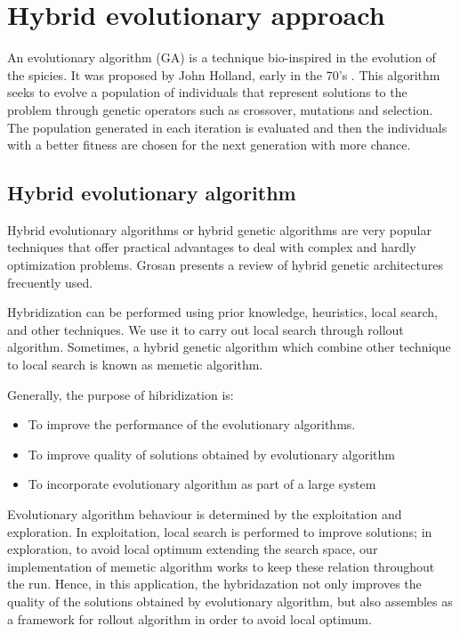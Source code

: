 \chapter{Hybrid evolutionary approach}
\label{chap:methodology}

An evolutionary algorithm (GA) is a technique bio-inspired in the evolution of the spicies. It was proposed by John Holland, early in the 70's \cite{Holland1975}. This algorithm seeks to evolve a population of individuals that represent solutions to the problem through genetic operators such as crossover, mutations and selection. The population generated in each iteration is evaluated and then the individuals with a better fitness are chosen for the next generation with more chance.

\section{Hybrid evolutionary algorithm}

Hybrid evolutionary algorithms or hybrid genetic algorithms are very popular techniques that offer practical advantages to deal with complex and hardly optimization problems. Grosan \cite{CrinaGrosan2007} presents a review of hybrid genetic architectures frecuently used. 

Hybridization can be performed using prior knowledge, heuristics, local search, and other techniques. We use it to carry out local search through rollout algorithm. Sometimes, a hybrid genetic algorithm which combine other technique to local search is known as memetic algorithm.

Generally, the purpose of hibridization is:

\begin{itemize}
 \item To improve the performance of the evolutionary algorithms.
 \item To improve quality of solutions obtained by evolutionary algorithm
 \item To incorporate evolutionary algorithm as part of a large system
\end{itemize}

Evolutionary algorithm behaviour is determined by the exploitation and exploration. In exploitation, local search is performed to improve solutions; in exploration, to avoid local optimum extending the search space, our implementation of memetic algorithm works to keep these relation throughout the run. Hence, in this application, the hybridazation not only improves the quality of the solutions obtained by evolutionary algorithm, but also  assembles as a framework for rollout algorithm in order to avoid local optimum.


